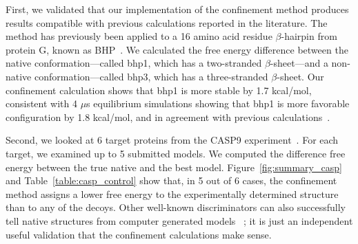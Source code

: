 \documentclass[12pt]{article}
\begin{document}
First, we validated that our implementation of the confinement method produces results compatible with previous
calculations reported in the literature.  The method has previously been applied to a 16 amino acid residue
$\beta$-hairpin from protein G, known as BHP~\cite{Cecchini2009}. We calculated the free energy difference between the
native conformation---called bhp1, which has a two-stranded $\beta$-sheet---and a non-native conformation---called bhp3,
which has a three-stranded $\beta$-sheet. Our confinement calculation shows that bhp1 is more stable by 1.7 kcal/mol,
consistent with 4 $\mu$s equilibrium simulations showing that bhp1 is more favorable configuration by 1.8 kcal/mol, and
in agreement with previous calculations~\cite{Cecchini2009}.

Second, we looked at 6 target proteins from the CASP9 experiment~\cite{Moult2011}.  For each target, we examined up to 5 submitted
models.  We computed the difference free energy between the true native and the best model.
Figure~\ref{fig:summary_casp} and Table~\ref{table:casp_control} show that, in 5 out of 6 cases, the confinement method
assigns a lower free energy to the experimentally determined structure than to any of the decoys.  Other well-known
discriminators can also successfully tell native structures from computer generated models~\cite{Sheffler2009,Zhou2002} 
; it is just an independent useful validation that the confinement calculations make
sense.
\end{document}
